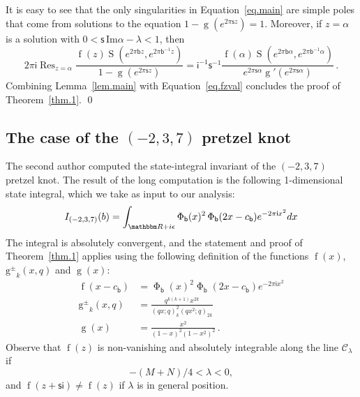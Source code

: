 \documentclass[12pt]{amsart}
\theoremstyle{definition}
\def\BR{\mathbbm R}
\newcommand{\im}{\mathsf{i}}
\newcommand{\fad}[1]{\operatorname{\Phi}_{#1}}
\begin{document}
It is easy to see that the only singularities in Equation~\eqref{eq.main} 
are simple poles that come from solutions to the equation 
$1-\operatorname{g}\! \left(e^{2\pi\mathsf{s}z}\right)=1$.
Moreover, if $z=\alpha$ is a solution with 
$0<\mathsf{s}\, \mathrm{Im}\alpha-\lambda<1$,
then
$$
2\pi\im \operatorname{Res}_{z=\alpha}
\frac{\operatorname{f}(z)\operatorname{S}\!
\left(e^{2\pi\mathsf{b}z},e^{2\pi\mathsf{b}^{-1}z}\right)}{1-\operatorname{g}\!
\left(e^{2\pi\mathsf{s}z}\right)} =
\im^{-1} \mathsf{s}^{-1}
\frac{\operatorname{f}(\alpha)\operatorname{S}\!
\left(e^{2\pi\mathsf{b}\alpha},e^{2\pi\mathsf{b}^{-1}\alpha}\right)}{
e^{2\pi\mathsf{s}\alpha} \operatorname{g}'
\left(e^{2\pi\mathsf{s}\alpha}\right)} \,.
$$
Combining Lemma~\ref{lem.main} with Equation~\eqref{eq.fzval} concludes
the proof of Theorem~\ref{thm.1}.
\qed

\subsection{The case of the $(-2,3,7)$ pretzel knot}
\label{sub.pretzel}

The second author computed the state-integral invariant of the $(-2,3,7)$
pretzel knot. The result of the long computation is the following 
1-dimensional state integral, which we take as input to our analysis:
\begin{equation}
\label{eq.I237}
I_{(-2,3,7)}(b)=\int_{\BR + i \epsilon} \fad{\mathsf{b}}(x)^2 
\fad{\mathsf{b}}(2x-c_{\mathsf{b}}) e^{-2 \pi \im x^2} dx
\end{equation}
The integral is absolutely convergent, and the statement and proof of 
Theorem~\ref{thm.1} applies using the following definition of the
functions $\operatorname{f}(x)$, $\operatorname{g^\pm}_k(x,q)$ and 
$\operatorname{g}(x)$:
\begin{subequations}
\begin{align}
\operatorname{f}(x-c_{\mathsf{b}}) &= 
\fad{\mathsf{b}}(x)^2 \fad{\mathsf{b}}(2x-c_{\mathsf{b}})e^{-2 \pi \im x^2} \\
\operatorname{g^\pm}_k(x,q) &=  \frac{
q^{k(k+1)} \!x^{2k} }{\left(q x;q\right)^{2}_k\!\left(q x^2;q\right)_{2k}}   \\
\operatorname{g}(x) &= \frac{x^2}{\left(1-x\right)^2\!\left(1-x^2\right)^2} \,.
\end{align}
\end{subequations}
Observe that $\operatorname{f}(z)$ is non-vanishing and absolutely 
integrable along the line $\mathcal{C}_{\lambda}$ if
\begin{equation}
-(M+N)/4<\lambda<0,
\end{equation}
and $\operatorname{f}(z+\mathsf{s}\im)\ne \operatorname{f}(z)$ if 
$\lambda$ is in general position. 
\end{document}
